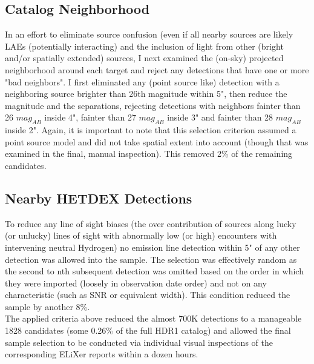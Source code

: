 \documentclass{aastex62}
\begin{document}
\subsection{Catalog Neighborhood}  \label{sec:catalog_neighbors}
In an effort to eliminate source confusion (even if all nearby sources are likely LAEs (potentially interacting) and the inclusion of light from other (bright and/or spatially extended) sources, I next examined the (on-sky) projected neighborhood around each target and reject any detections that have one or more "bad neighbors". I first eliminated any (point source like) detection with a neighboring source brighter than 26th magnitude within 5", then reduce the magnitude and the separations, rejecting detections with neighbors fainter than 26 $mag_{AB}$ inside 4", fainter than 27 $mag_{AB}$ inside 3" and fainter than 28 $mag_{AB}$ inside 2". Again, it is important to note that this selection criterion assumed a point source model and did not take spatial extent into account (though that was examined in the final, manual inspection). This removed 2\% of the remaining candidates.\\


\subsection{Nearby HETDEX Detections}
To reduce any line of sight biases (the over contribution of sources along lucky (or unlucky) lines of sight with abnormally low (or high) encounters with intervening neutral Hydrogen) no emission line detection within 5" of any other detection was allowed into the sample. The selection was effectively random as the second to nth subsequent detection was omitted based on the order in which they were imported (loosely in observation date order) and not on any characteristic (such as SNR or equivalent width). This condition reduced the sample by another 8\%.\\

The applied criteria above reduced the almost 700K detections to a manageable 1828 candidates (some 0.26\% of the full HDR1 catalog) and allowed the final sample selection to be conducted via individual visual inspections of the corresponding ELiXer reports within a dozen hours.\\
\end{document}
